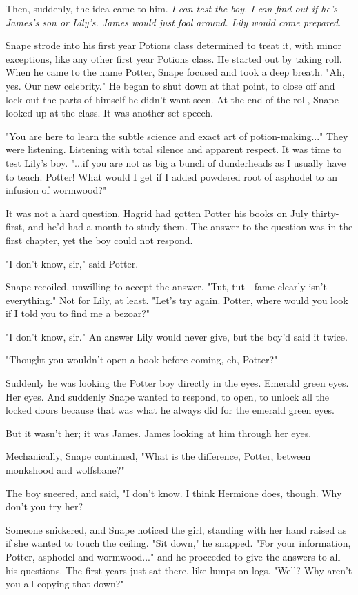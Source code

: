 \documentclass[a4paper,11pt]{article}
\begin{document}
Then, suddenly, the idea came to him. \emph{I can test the boy. I can find out if he's James's son or Lily's. James would just fool around. Lily would come prepared.}

Snape strode into his first year Potions class determined to treat it, with minor exceptions, like any other first year Potions class. He started out by taking roll. When he came to the name Potter, Snape focused and took a deep breath. "Ah, yes. Our new celebrity." He began to shut down at that point, to close off and lock out the parts of himself he didn't want seen. At the end of the roll, Snape looked up at the class. It was another set speech.

"You are here to learn the subtle science and exact art of potion-making..." They were listening. Listening with total silence and apparent respect. It was time to test Lily's boy. "...if you are not as big a bunch of dunderheads as I usually have to teach. Potter! What would I get if I added powdered root of asphodel to an infusion of wormwood?"

It was not a hard question. Hagrid had gotten Potter his books on July thirty-first, and he'd had a month to study them. The answer to the question was in the first chapter, yet the boy could not respond.

"I don't know, sir," said Potter.

Snape recoiled, unwilling to accept the answer. "Tut, tut - fame clearly isn't everything." Not for Lily, at least. "Let's try again. Potter, where would you look if I told you to find me a bezoar?"

"I don't know, sir." An answer Lily would never give, but the boy'd said it twice.

"Thought you wouldn't open a book before coming, eh, Potter?"

Suddenly he was looking the Potter boy directly in the eyes. Emerald green eyes. Her eyes. And suddenly Snape wanted to respond, to open, to unlock all the locked doors because that was what he always did for the emerald green eyes.

But it wasn't her; it was James. James looking at him through her eyes.

Mechanically, Snape continued, "What is the difference, Potter, between monkshood and wolfsbane?"

The boy sneered, and said, "I don't know. I think Hermione does, though. Why don't you try her?

Someone snickered, and Snape noticed the girl, standing with her hand raised as if she wanted to touch the ceiling. "Sit down," he snapped. "For your information, Potter, asphodel and wormwood..." and he proceeded to give the answers to all his questions. The first years just sat there, like lumps on logs. "Well? Why aren't you all copying that down?"
\end{document}
